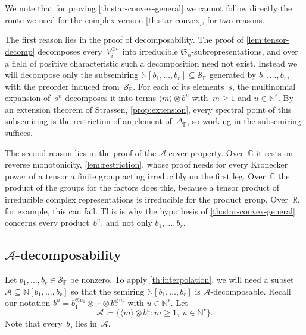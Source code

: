 \documentclass[11pt,letterpaper]{article}
\newcommand{\FF}{\mathbb{F}}
\newcommand{\RR}{\mathbb{R}}
\newcommand{\CC}{\mathbb{C}}
\newcommand{\NN}{\mathbb{N}}
\begin{document}
We note that for proving \cref{th:star-convex-general}  we cannot follow directly the route we used for the complex version \cref{th:star-convex}, for two reasons.

The first reason lies in the proof of decomposability. The proof of \cref{lem:tensor-decomp} decomposes every~$V_i^{\otimes n}$ into irreducible $\mathfrak{S}_n$-subrepresentations, and over a field of positive characteristic such a decomposition need not exist. Instead we will decompose only the subsemiring $\NN[b_1, \ldots, b_r] \subseteq \mathcal{S}_\FF$ generated by $b_1, \ldots, b_r$, with the preorder induced from~$\mathcal{S}_\FF$. For each of its elements~$s$, the multinomial expansion of~$s^n$ decomposes it into terms $\langle m \rangle \otimes b^u$ with~$m \geq 1$ and $u \in \NN^r$. By an extension theorem of Strassen, \cref{prop:extension}, every spectral point of this subsemiring is the restriction of an element of~$\Delta_\FF$, so working in the subsemiring suffices.

The second reason lies in the proof of the $\mathcal{A}$-cover property. Over~$\CC$ it rests on reverse monotonicity, \cref{lem:restriction}, whose proof needs for every Kronecker power of a tensor a finite group acting irreducibly on the first leg. Over~$\CC$ the product of the groups for the factors does this, because a tensor product of irreducible complex representations is irreducible for the product group. Over~$\RR$, for example, this can fail. This is why the hypothesis of \cref{th:star-convex-general} concerns every product~$b^u$, and not only $b_1, \ldots, b_r$.

\subsection{\texorpdfstring{$\mathcal{A}$}{A}-decomposability}\label{sec:mm-decomp}

Let $b_1, \ldots, b_r \in \mathcal{S}_\FF$ be nonzero.
To apply \cref{th:interpolation}, we will need a subset $\mathcal{A}\subseteq \NN[b_1, \ldots, b_r]$ so that the semiring $\NN[b_1, \ldots, b_r]$ is $\mathcal{A}$-decomposable. Recall our notation $b^u = b_1^{\otimes u_1} \otimes \cdots \otimes b_r^{\otimes u_r}$ with $u \in \NN^r$. Let
\[
\mathcal{A} \coloneqq \{ \langle m \rangle \otimes b^{u} : m \geq 1,\ u \in \NN^r \}.
\]
Note that every~$b_j$ lies in~$\mathcal{A}$.
\end{document}
